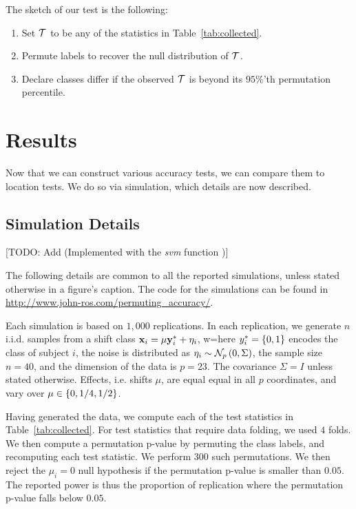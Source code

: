 \documentclass[12pt,a4paper]{article}
\begin{document}
The sketch of our test is the following:
\begin{enumerate}\itemsep0em 
	\item Set $\mathcal{T}$ to be any of the statistics in Table~\ref{tab:collected}.
	\item Permute labels to recover the null distribution of $\mathcal{T}$. 
	\item Declare classes differ if the observed $\mathcal{T}$ is beyond its $95\%$'th permutation percentile.  
\end{enumerate}





\section{Results}

Now that we can construct various accuracy tests, we can compare them to location tests. 
We do so via simulation, which details are now described.



\subsection{Simulation Details}
\label{apx:simulation_details}

[TODO: Add (Implemented with the \emph{svm} \R function \citep{meyer_e1071:_2015})]

The following details are common to all the reported simulations, unless stated otherwise in a figure's caption. 
The \R code for the simulations can be found in \url{http://www.john-ros.com/permuting_accuracy/}.

Each simulation is based on $1,000$ replications. 
In each replication, we generate $n$ i.i.d. samples from a shift class $\mathbf{x}_i = \mu \mathbf{y}^*_i + \eta_i$, w=here $y^*_i=\{ 0,1 \}$ encodes the class of subject $i$, the noise is distributed as $\eta_i \sim \mathcal{N}_{p}\left(0,\Sigma\right)$, the sample size $n=40$, and the dimension of the data is $p=23$. 
The covariance $\Sigma=I$ unless stated otherwise. 
Effects, i.e. shifts $\mu$, are equal equal in all $p$ coordinates, and vary over $\mu \in \{ 0,1/4,1/2 \}$.

Having generated the data, we compute each of the test statistics in Table~\ref{tab:collected}.
For test statistics that require data folding, we used $4$ folds. 
We then compute a permutation p-value by permuting the class labels, and recomputing each test statistic. 
We perform $300$ such permutations. 
We then reject the $\mu_i=0$ null hypothesis if the permutation p-value is smaller than $0.05$.
The reported power is thus the proportion of replication where the permutation p-value falls below $0.05$.
\end{document}
